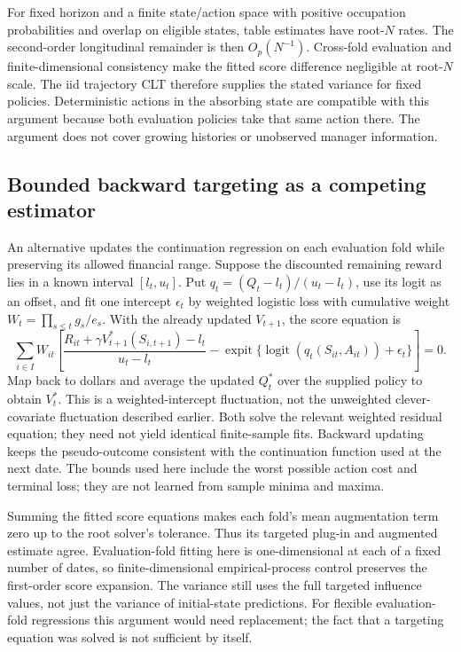 For fixed horizon and a finite state/action space with positive occupation
probabilities and overlap on eligible states, table estimates have root-$N$
rates. The second-order longitudinal remainder is then $O_p(N^{-1})$.
Cross-fold evaluation and finite-dimensional consistency make the fitted
score difference negligible at root-$N$ scale. The iid trajectory CLT
therefore supplies the stated variance for fixed policies. Deterministic
actions in the absorbing state are compatible with this argument because
both evaluation policies take that same action there. The argument does
not cover growing histories or unobserved manager information.

\subsection{Bounded backward targeting as a competing estimator}
An alternative updates the continuation regression on each evaluation
fold while preserving its allowed financial range. Suppose the discounted
remaining reward lies in a known interval $[l_t,u_t]$. Put
$q_t=(Q_t-l_t)/(u_t-l_t)$, use its logit as an offset, and fit one
intercept $\epsilon_t$ by weighted logistic loss with cumulative weight
$W_t=\prod_{s\le t}g_s/e_s$. With the already updated $V_{t+1}$,
the score equation is
\[
 \sum_{i\in I}W_{it}\left[
 \frac{R_{it}+\gamma V_{t+1}^*(S_{i,t+1})-l_t}{u_t-l_t}
 -\operatorname{expit}\{\operatorname{logit}(q_t(S_{it},A_{it}))+\epsilon_t\}
 \right]=0.
\]
Map back to dollars and average the updated $Q_t^*$ over the supplied
policy to obtain $V_t^*$. This is a weighted-intercept fluctuation, not
the unweighted clever-covariate fluctuation described earlier. Both solve
the relevant weighted residual equation; they need not yield identical
finite-sample fits. Backward updating keeps the pseudo-outcome consistent
with the continuation function used at the next date. The bounds used here
include the worst possible action cost and terminal loss; they are not
learned from sample minima and maxima.

Summing the fitted score equations makes each fold's mean augmentation
term zero up to the root solver's tolerance. Thus its targeted plug-in and
augmented estimate agree. Evaluation-fold fitting here is one-dimensional
at each of a fixed number of dates, so finite-dimensional empirical-process
control preserves the first-order score expansion. The variance still uses
the full targeted influence values, not just the variance of initial-state
predictions. For flexible evaluation-fold regressions this argument would
need replacement; the fact that a targeting equation was solved is not
sufficient by itself.

